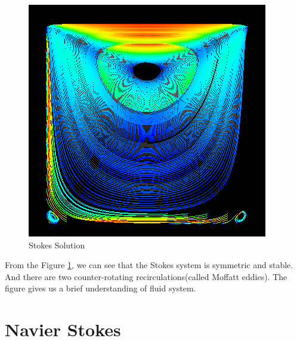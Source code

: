 \documentclass[a4paper]{article}
\begin{document}
\begin{figure}[h]
\centering
\includegraphics[scale = 0.4]{Stokes.png}
\caption{Stokes Solution}
\label{im::Stokes-Solution}
\end{figure}

From the Figure \ref{im::Stokes-Solution}, we can see that the Stokes system is symmetric and stable. And there are two counter-rotating recirculations(called Moffatt eddies). The figure gives us a brief understanding of fluid system.


\section{Navier Stokes}
\end{document}
